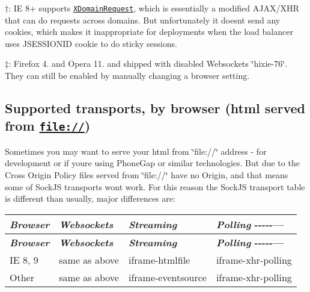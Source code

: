 \begin{DoxyItemize}
\item {\bfseries {$\dagger$}}\+: IE 8+ supports \href{https://blogs.msdn.microsoft.com/ieinternals/2010/05/13/xdomainrequest-restrictions-limitations-and-workarounds/}{\tt X\+Domain\+Request}, which is essentially a modified A\+J\+A\+X/\+X\+HR that can do requests across domains. But unfortunately it doesn\textquotesingle{}t send any cookies, which makes it inappropriate for deployments when the load balancer uses J\+S\+E\+S\+S\+I\+O\+N\+ID cookie to do sticky sessions.
\item {\bfseries {$\ddagger$}}\+: Firefox 4. and Opera 11. and shipped with disabled Websockets \char`\"{}hixie-\/76\char`\"{}. They can still be enabled by manually changing a browser setting.
\end{DoxyItemize}

\subsection*{Supported transports, by browser (html served from \href{file://}{\tt file\+://}) }

Sometimes you may want to serve your html from \char`\"{}file\+://\char`\"{} address -\/ for development or if you\textquotesingle{}re using Phone\+Gap or similar technologies. But due to the Cross Origin Policy files served from \char`\"{}file\+://\char`\"{} have no Origin, and that means some of Sock\+JS transports won\textquotesingle{}t work. For this reason the Sock\+JS transport table is different than usually, major differences are\+:

\tabulinesep=1mm
\begin{longtabu} spread 0pt [c]{*{4}{|X[-1]}|}
\hline
\rowcolor{\tableheadbgcolor}\textbf{ {\itshape Browser}  }&\textbf{ {\itshape Websockets}  }&\textbf{ {\itshape Streaming}  }&\textbf{ {\itshape Polling} -\/-\/-\/-\/-\/---   }\\
\endfirsthead
\hline
\endfoot
\hline
\rowcolor{\tableheadbgcolor}\textbf{ {\itshape Browser}  }&\textbf{ {\itshape Websockets}  }&\textbf{ {\itshape Streaming}  }&\textbf{ {\itshape Polling} -\/-\/-\/-\/-\/---   }\\
\endhead
IE 8, 9  &same as above  &iframe-\/htmlfile  &iframe-\/xhr-\/polling   \\
Other  &same as above  &iframe-\/eventsource  &iframe-\/xhr-\/polling   \\
\end{longtabu}


